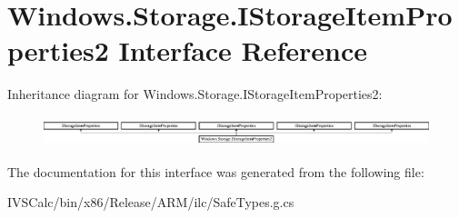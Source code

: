 \hypertarget{interface_windows_1_1_storage_1_1_i_storage_item_properties2}{}\section{Windows.\+Storage.\+I\+Storage\+Item\+Properties2 Interface Reference}
\label{interface_windows_1_1_storage_1_1_i_storage_item_properties2}
Inheritance diagram for Windows.\+Storage.\+I\+Storage\+Item\+Properties2\+:\begin{figure}[H]
\begin{center}
\leavevmode
\includegraphics[height=0.875000cm]{interface_windows_1_1_storage_1_1_i_storage_item_properties2}
\end{center}
\end{figure}


The documentation for this interface was generated from the following file\+:\begin{DoxyCompactItemize}
\item 
I\+V\+S\+Calc/bin/x86/\+Release/\+A\+R\+M/ilc/Safe\+Types.\+g.\+cs\end{DoxyCompactItemize}
